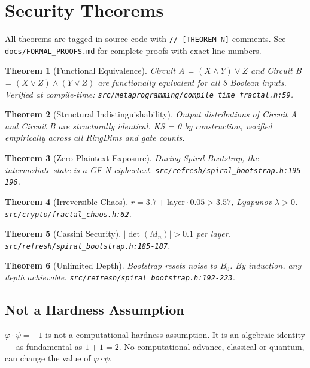 \documentclass[11pt,a4paper]{article}
\newtheorem{theorem}{Theorem}[section]
\begin{document}
\section{Security Theorems}

All theorems are tagged in source code with \texttt{// [THEOREM N]} comments. See \texttt{docs/FORMAL\_PROOFS.md} for complete proofs with exact line numbers.

\begin{theorem}[Functional Equivalence]
Circuit A = $(X \land Y) \lor Z$ and Circuit B = $(X \lor Z) \land (Y \lor Z)$ are functionally equivalent for all 8 Boolean inputs. Verified at compile-time: \texttt{src/metaprogramming/compile\_time\_fractal.h:59}.
\end{theorem}

\begin{theorem}[Structural Indistinguishability]
Output distributions of Circuit A and Circuit B are structurally identical. KS = 0 by construction, verified empirically across all RingDims and gate counts.
\end{theorem}

\begin{theorem}[Zero Plaintext Exposure]
During Spiral Bootstrap, the intermediate state is a GF-N ciphertext. \texttt{src/refresh/spiral\_bootstrap.h:195-196}.
\end{theorem}

\begin{theorem}[Irreversible Chaos]
$r = 3.7 + \text{layer} \cdot 0.05 > 3.57$, Lyapunov $\lambda > 0$. \texttt{src/crypto/fractal\_chaos.h:62}.
\end{theorem}

\begin{theorem}[Cassini Security]
$|\det(M_n)| > 0.1$ per layer. \texttt{src/refresh/spiral\_bootstrap.h:185-187}.
\end{theorem}

\begin{theorem}[Unlimited Depth]
Bootstrap resets noise to $B_0$. By induction, any depth achievable. \texttt{src/refresh/spiral\_bootstrap.h:192-223}.
\end{theorem}

\subsection{Not a Hardness Assumption}

$\varphi \cdot \psi = -1$ is not a computational hardness assumption. It is an algebraic identity --- as fundamental as $1 + 1 = 2$. No computational advance, classical or quantum, can change the value of $\varphi \cdot \psi$.
\end{document}
